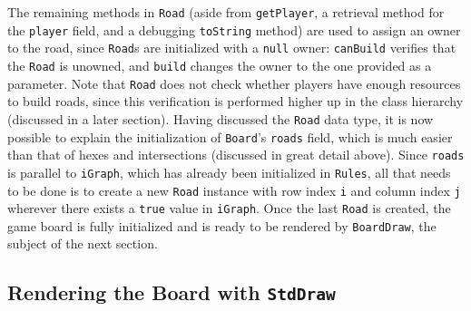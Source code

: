 \documentclass[pageno]{jpaper}
\begin{document}
\begin{doublespacing}
The remaining methods in \lstinline$Road$ (aside from \lstinline$getPlayer$, a retrieval method for the \lstinline$player$ field, and a debugging \lstinline$toString$ method) are used to assign an owner to the road, since \lstinline$Road$s are initialized with a \lstinline$null$ owner: \lstinline$canBuild$ verifies that the \lstinline$Road$ is unowned, and \lstinline$build$ changes the owner to the one provided as a parameter. Note that \lstinline$Road$ does not check whether players have enough resources to build roads, since this verification is performed higher up in the class hierarchy (discussed in a later section). Having discussed the \lstinline$Road$ data type, it is now possible to explain the initialization of \lstinline$Board$'s \lstinline$roads$ field, which is much easier than that of hexes and intersections (discussed in great detail above). Since \lstinline$roads$ is parallel to \lstinline$iGraph$, which has already been initialized in \lstinline$Rules$, all that needs to be done is to create a new \lstinline$Road$ instance with row index \lstinline$i$ and column index \lstinline$j$ wherever there exists a \lstinline$true$ value in \lstinline$iGraph$. Once the last \lstinline$Road$ is created, the game board is fully initialized and is ready to be rendered by \lstinline$BoardDraw$, the subject of the next section.

\hypertarget{sec:rendering_the_board_with_stddraw}{}
\subsection{Rendering the Board with \lstinline$StdDraw$ \cite{princetoncs}}


\end{doublespacing}
\end{document}
